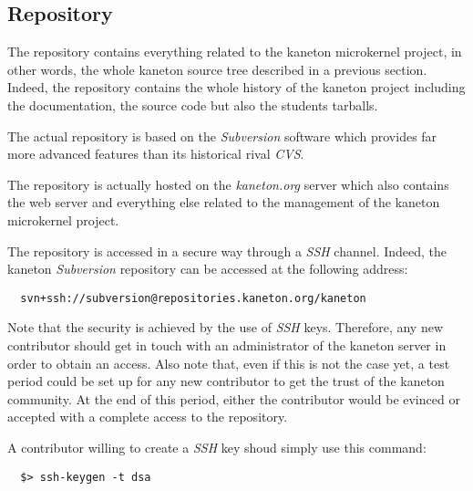 %
%
%
%
%
%

%
%

\subsection{Repository}
\label{section:repository}

The repository contains everything related to the kaneton microkernel
project, in other words, the whole kaneton source tree described in a
previous section. Indeed, the repository contains the whole history
of the kaneton project including the documentation, the source code
but also the students tarballs.

The actual repository is based on the \textit{Subversion} software which
provides far more advanced features than its historical rival \textit{CVS}.

The repository is actually hosted on the \textit{kaneton.org} server which
also contains the web server and everything else related to the management
of the kaneton microkernel project.

The repository is accessed in a secure way through a \textit{SSH} channel.
Indeed, the kaneton \textit{Subversion} repository can be accessed at the
following address:

\begin{verbatim}
  svn+ssh://subversion@repositories.kaneton.org/kaneton
\end{verbatim}

Note that the security is achieved by the use of \textit{SSH} keys. Therefore,
any new contributor should get in touch with an administrator of the
kaneton server in order to obtain an access. Also note that, even if this is
not the case yet, a test period could be set up for any new contributor
to get the trust of the kaneton community. At the end of this period,
either the contributor would be evinced or accepted with a complete access to
the repository.

A contributor willing to create a \textit{SSH} key shoud simply use this
command:

\begin{verbatim}
  $> ssh-keygen -t dsa
\end{verbatim}

